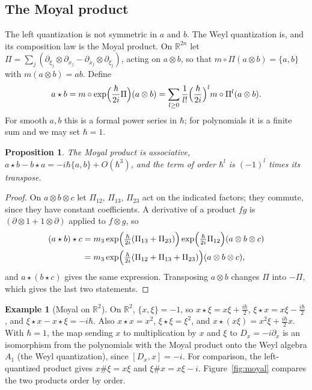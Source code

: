 \documentclass[11pt,oneside,reqno]{article}
\newcommand{\R}{\mathbb R}
\newcommand{\hb}{\hbar}
\newcommand{\pa}{\partial}
\theoremstyle{plain}
\newtheorem{proposition}[theorem]{Proposition}
\theoremstyle{definition}
\newtheorem{example}[theorem]{Example}
\theoremstyle{remark}
\begin{document}
\subsection{The Moyal product}\label{subsec:moyal}
The left quantization is not symmetric in \(a\) and \(b\). The Weyl quantization is,
and its composition law is the Moyal product. On \(\R^{2n}\) let
\(\Pi=\sum_j(\pa_{\xi_j}\otimes\pa_{x_j}-\pa_{x_j}\otimes\pa_{\xi_j})\), acting on
\(a\otimes b\), so that \(m\circ\Pi(a\otimes b)=\{a,b\}\) with \(m(a\otimes b)=ab\). Define
\[
 a\star b=m\circ\exp\Bigl(\frac{\hb}{2i}\Pi\Bigr)(a\otimes b)=
 \sum_{l\ge0}\frac1{l!}\Bigl(\frac{\hb}{2i}\Bigr)^lm\circ\Pi^l(a\otimes b).
\]
For smooth \(a,b\) this is a formal power series in \(\hb\); for polynomials it is a
finite sum and we may set \(\hb=1\).

\begin{proposition}\label{prop:moyal}
The Moyal product is associative, \(a\star b-b\star a=-i\hb\{a,b\}+O(\hb^3)\), and
the term of order \(\hb^l\) is \((-1)^l\) times its transpose.
\end{proposition}

\begin{proof}
On \(a\otimes b\otimes c\) let \(\Pi_{12}\), \(\Pi_{13}\), \(\Pi_{23}\) act on the indicated factors;
they commute, since they have constant coefficients. A derivative of a product
\(fg\) is \((\pa\otimes1+1\otimes\pa)\) applied to \(f\otimes g\), so
\begin{align*}
 (a\star b)\star c&=m_3\exp\Bigl(\tfrac{\hb}{2i}(\Pi_{13}+\Pi_{23})\Bigr)
 \exp\Bigl(\tfrac{\hb}{2i}\Pi_{12}\Bigr)(a\otimes b\otimes c)\\
 &=m_3\exp\Bigl(\tfrac{\hb}{2i}(\Pi_{12}+\Pi_{13}+\Pi_{23})\Bigr)(a\otimes b\otimes c),
\end{align*}
and \(a\star(b\star c)\) gives the same expression. Transposing \(a\otimes b\) changes
\(\Pi\) into \(-\Pi\), which gives the last two statements.
\end{proof}

\begin{example}[Moyal on \(\R^2\)]\label{ex:moyalR2}
On \(\R^2\), \(\{x,\xi\}=-1\), so
\(x\star\xi=x\xi+\frac{i\hb}2\), \(\xi\star x=x\xi-\frac{i\hb}2\), and
\(\xi\star x-x\star\xi=-i\hb\). Also \(x\star x=x^2\), \(\xi\star\xi=\xi^2\), and
\(x\star(x\xi)=x^2\xi+\frac{i\hb}2x\). With \(\hb=1\), the map sending \(x\) to
multiplication by \(x\) and \(\xi\) to \(D_x=-i\pa_x\) is an isomorphism from the
polynomials with the Moyal product onto the Weyl algebra \(A_1\) (the Weyl
quantization), since \([D_x,x]=-i\). For comparison, the left-quantized product
gives \(x\#\xi=x\xi\) and \(\xi\#x=x\xi-i\). Figure~\ref{fig:moyal} compares the
two products order by order.
\end{example}
\end{document}

